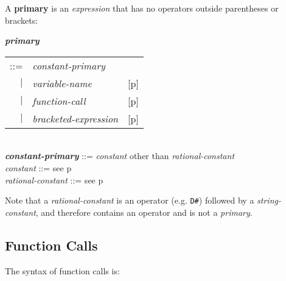 \documentclass[12pt]{article}
\newcommand{\key}[1]{{\rm \bfseries #1}}
\newcommand{\emkey}[1]{{\em \bfseries #1}}
\newcommand{\pagref}[1]{p\pageref{#1}}
\newenvironment{indpar}[1][0.3in]%
	{\begin{list}{}%
		     {\setlength{\itemsep}{0in}%
		      \setlength{\topsep}{0in}%
		      \setlength{\parsep}{1ex}%
		      \setlength{\labelwidth}{#1}%
		      \setlength{\leftmargin}{#1}%
		      \addtolength{\leftmargin}{\labelsep}}%
	 \item}%
	{\end{list}}
\begin{document}
A \key{primary} is an {\em expression} that has no operators outside
parentheses or brackets:
\begin{indpar}
\emkey{primary}
    \begin{tabular}[t]{@{}rll}
    ::= & {\em constant-primary} \\
    $|$ & {\em variable-name}           & [\pagref{VARIABLE-NAMES}] \\
    $|$ & {\em function-call}		& [\pagref{FUNCTION-CALLS}] \\
    $|$ & {\em bracketed-expression}	& [\pagref{BRACKETED-EXPRESSIONS}] \\
    \end{tabular}
\\[0.5ex]
\emkey{constant-primary} ::= {\em constant} other than {\em rational-constant}
\\[0.5ex]
{\em constant} ::= see \pagref{CONSTANTS}
\\[0.5ex]
{\em rational-constant} ::= see \pagref{RATIONAL-CONSTANTS}

\end{indpar}

Note that a {\em rational-constant} is an operator (e.g. {\tt D\#})
followed by a {\em string-constant}, and therefore contains an operator
and is not a {\em primary}.


\subsection{Function Calls}
\label{FUNCTION-CALLS}

The syntax of function calls is:
\end{document}

